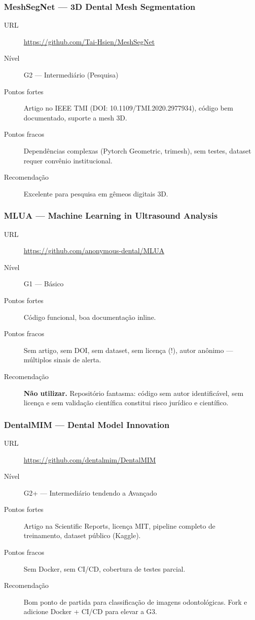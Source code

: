 \subsubsection{MeshSegNet — 3D Dental Mesh Segmentation}

\begin{description}
  \item[URL] \url{https://github.com/Tai-Hsien/MeshSegNet}
  \item[Nível] G2 — Intermediário (Pesquisa)
  \item[Pontos fortes] Artigo no IEEE TMI (DOI: 10.1109/TMI.2020.2977934),
    código bem documentado, suporte a mesh 3D.
  \item[Pontos fracos] Dependências complexas (Pytorch Geometric, trimesh),
    sem testes, dataset requer convênio institucional.
  \item[Recomendação] Excelente para pesquisa em gêmeos digitais 3D.
\end{description}

\subsubsection{MLUA — Machine Learning in Ultrasound Analysis}

\begin{description}
  \item[URL] \url{https://github.com/anonymous-dental/MLUA}
  \item[Nível] G1 — Básico
  \item[Pontos fortes] Código funcional, boa documentação inline.
  \item[Pontos fracos] Sem artigo, sem DOI, sem dataset, sem licença (!),
    autor anônimo — múltiplos sinais de alerta.
  \item[Recomendação] \textbf{Não utilizar.} Repositório fantasma: código
    sem autor identificável, sem licença e sem validação científica
    constitui risco jurídico e científico.
\end{description}

\subsubsection{DentalMIM — Dental Model Innovation}

\begin{description}
  \item[URL] \url{https://github.com/dentalmim/DentalMIM}
  \item[Nível] G2+ — Intermediário tendendo a Avançado
  \item[Pontos fortes] Artigo na Scientific Reports, licença MIT,
    pipeline completo de treinamento, dataset público (Kaggle).
  \item[Pontos fracos] Sem Docker, sem CI/CD, cobertura de testes parcial.
  \item[Recomendação] Bom ponto de partida para classificação de imagens
    odontológicas. Fork e adicione Docker + CI/CD para elevar a G3.
\end{description}

